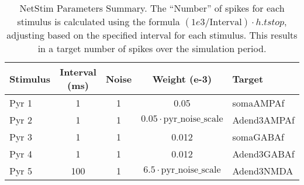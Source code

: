 \begin{table}[htbp]
    \centering
    \caption[NetStim Parameters Summary]{NetStim Parameters Summary. The ``Number'' of spikes for each stimulus is calculated using the formula \((1e3 / \text{Interval}) \cdot h.tstop\), adjusting based on the specified interval for each stimulus.
        This results in a target number of spikes over the simulation period.}
    \begin{tabular}{lcccl}
        \hline
        \textbf{Stimulus} & \textbf{Interval (ms)} & \textbf{Noise} & \textbf{Weight (e-3)}                   & \textbf{Target} \\
        \hline
        Pyr 1             & 1                      & 1              & 0.05                                    & somaAMPAf       \\
        Pyr 2             & 1                      & 1              & \(0.05 \cdot \text{pyr\_noise\_scale}\) & Adend3AMPAf     \\
        Pyr 3             & 1                      & 1              & 0.012                                   & somaGABAf       \\
        Pyr 4             & 1                      & 1              & 0.012                                   & Adend3GABAf     \\
        Pyr 5             & 100                    & 1              & \(6.5 \cdot \text{pyr\_noise\_scale}\)  & Adend3NMDA      \\ \hline
    \end{tabular}
\end{table}\label{table:netstimparams_reduced}